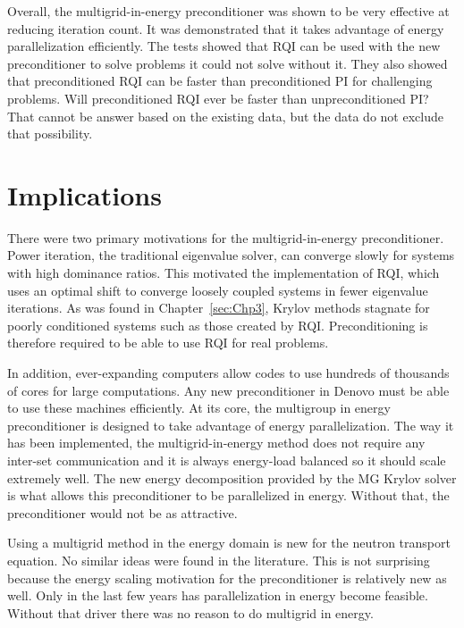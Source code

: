 Overall, the multigrid-in-energy preconditioner was shown to be very effective at reducing iteration count. It was demonstrated that it takes advantage of energy parallelization efficiently. The tests showed that RQI can be used with the new preconditioner to solve problems it could not solve without it. They also showed that preconditioned RQI can be faster than preconditioned PI for challenging problems. Will preconditioned RQI ever be faster than unpreconditioned PI? That cannot be answer based on the existing data, but the data do not exclude that possibility. 

\section{Implications}
There were two primary motivations for the multigrid-in-energy preconditioner. Power iteration, the traditional eigenvalue solver, can converge slowly for systems with high dominance ratios. This motivated the implementation of RQI, which uses an optimal shift to converge loosely coupled systems in fewer eigenvalue iterations. As was found in Chapter~\ref{sec:Chp3}, Krylov methods stagnate for poorly conditioned systems such as those created by RQI. Preconditioning is therefore required to be able to use RQI for real problems. 

In addition, ever-expanding computers allow codes to use hundreds of thousands of cores for large computations. Any new preconditioner in Denovo must be able to use these machines efficiently. At its core, the multigroup in energy preconditioner is designed to take advantage of energy parallelization. The way it has been implemented, the multigrid-in-energy method does not require any inter-set communication and it is always energy-load balanced so it should scale extremely well. The new energy decomposition provided by the MG Krylov solver is what allows this preconditioner to be parallelized in energy. Without that, the preconditioner would not be as attractive. 

Using a multigrid method in the energy domain is new for the neutron transport equation. No similar ideas were found in the literature. This is not surprising because the energy scaling motivation for the preconditioner is relatively new as well. Only in the last few years has parallelization in energy become feasible. Without that driver there was no reason to do multigrid in energy. 

